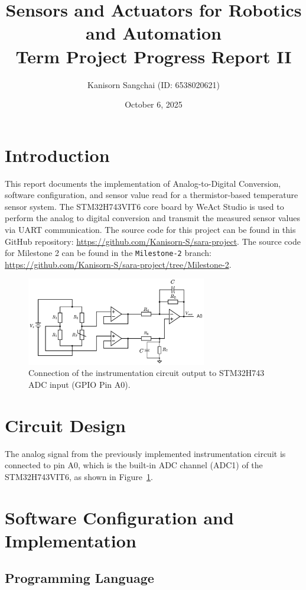 \documentclass[12pt,a4paper]{article}
\title{Sensors and Actuators for Robotics and
Automation\\Term Project Progress Report II}
\author{Kanisorn Sangchai (ID: 6538020621)}
\date{October 6, 2025}
\begin{document}
\maketitle

\section{Introduction}
This report documents the implementation of Analog-to-Digital Conversion, software configuration, and sensor value read for a thermistor-based temperature sensor system. The STM32H743VIT6 core board by WeAct Studio is used to perform the analog to digital conversion and transmit the measured sensor values via UART communication. The source code for this project can be found in this GitHub repository: \url{https://github.com/Kanisorn-S/sara-project}. The source code for Milestone 2 can be found in the \texttt{Milestone-2} branch: \url{https://github.com/Kanisorn-S/sara-project/tree/Milestone-2}.

\begin{figure}[h]
    \centering
    \includegraphics[width=0.7\textwidth]{images/circuit_diagram.png}
    \caption{Connection of the instrumentation circuit output to STM32H743 ADC input (GPIO Pin A0).}
    \label{fig:circuit}
\end{figure}

\section{Circuit Design}
The analog signal from the previously implemented instrumentation circuit is connected to pin A0, which is the built-in ADC channel (ADC1) of the STM32H743VIT6, as shown in Figure~\ref{fig:circuit}.  

\section{Software Configuration and Implementation}

\subsection{Programming Language}
\end{document}
